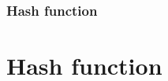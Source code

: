 \section[Section]{Hash function}
\part{Hash function}
\begin{frame}
	\partpage
	\centering
\end{frame}
